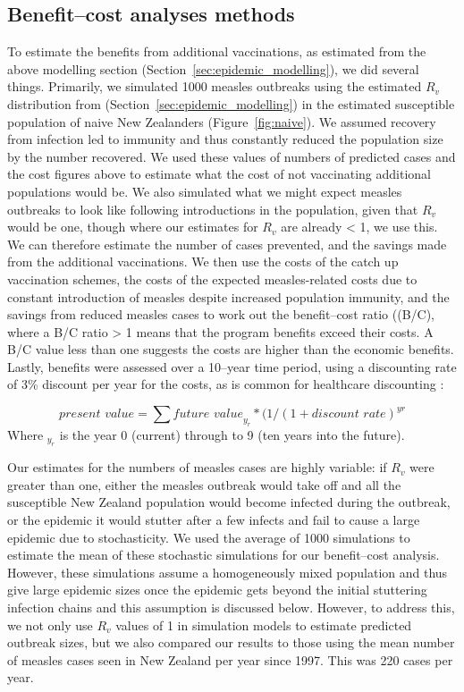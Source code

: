 \documentclass{article}
\begin{document}
\subsection{Benefit--cost analyses methods}
To estimate the benefits from additional vaccinations, as estimated from the above modelling section (Section~\ref{sec:epidemic_modelling}), we did several things. Primarily, we simulated 1000 measles outbreaks using the estimated $R_v$ distribution from (Section~\ref{sec:epidemic_modelling}) in the estimated susceptible population of naive New Zealanders (Figure~\ref{fig:naive}). We assumed recovery from infection led to immunity and thus constantly reduced the population size by the number recovered. We used these values of numbers of predicted cases and the cost figures above to estimate what the cost of not vaccinating additional populations would be. We also simulated what we might expect measles outbreaks to look like following introductions in the population, given that $R_v$ would be one, though where our estimates for $R_v$ are already < 1, we use this. We can therefore estimate the number of cases prevented, and the savings made from the additional vaccinations. We then use the costs of the catch up vaccination schemes, the costs of the expected measles-related costs due to constant introduction of measles despite increased population immunity, and the savings from reduced measles cases to work out the benefit--cost ratio ((B/C), where a B/C ratio > 1 means that the program benefits exceed their costs. A B/C value less than one suggests the costs are higher than the economic benefits. Lastly, benefits were assessed over a 10--year time period, using a discounting rate of 3\% discount per year for the costs, as is common for healthcare discounting \citep{honeycutt6}:

\begin{equation} \label{eq:disc}
\textit{present value} = \sum \textit{future value}_y_r * (1/(1+\textit{discount rate})^{yr}
  \end{equation}
Where $_y_r$ is the year 0 (current) through to 9 (ten years into the future).

Our estimates for the numbers of measles cases are highly variable: if $R_v$ were greater than one, either the measles outbreak would take off and all the susceptible New Zealand population would become infected during the outbreak, or the epidemic it would stutter after a few infects and fail to cause a large epidemic due to stochasticity. We used the average of 1000 simulations to estimate the mean of these stochastic simulations for our benefit--cost analysis. However, these simulations assume a homogeneously mixed population and thus give large epidemic sizes once the epidemic gets beyond the initial stuttering infection chains and this assumption is discussed below. However, to address this, we not only use $R_v$ values of 1 in simulation models to estimate predicted outbreak sizes, but we also compared our results to those using the mean number of measles cases seen in New Zealand per year since 1997. This was 220 cases per year.
\end{document}
